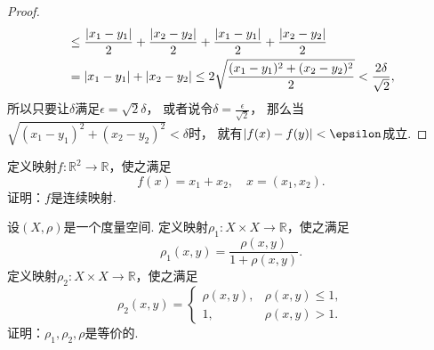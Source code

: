 \begin{example}
\begin{proof}
\begin{align*}
	&\leq \frac{\abs{x_1-y_1}}{2} + \frac{\abs{x_2-y_2}}{2} + \frac{\abs{x_1-y_1}}{2} + \frac{\abs{x_2-y_2}}{2} \\
	&= \abs{x_1-y_1} + \abs{x_2-y_2}
	\leq 2\sqrt{\frac{(x_1-y_1)^2+(x_2-y_2)^2}{2}}
	< \frac{2\delta}{\sqrt2},
\end{align*}
所以只要让\(\delta\)满足\(\epsilon = \sqrt2 \delta\)，
或者说令\(\delta = \frac{\epsilon}{\sqrt2}\)，
那么当\(\sqrt{(x_1-y_1)^2+(x_2-y_2)^2} < \delta\)时，
就有\(\abs{f(x) - f(y)} < \epsilon\)成立.
\end{proof}
\end{example}

\begin{example}
定义映射\(f\colon \mathbb{R}^2 \to \mathbb{R}\)，使之满足\begin{equation*}
	f(x) = x_1 + x_2,
	\quad x=(x_1,x_2).
\end{equation*}
证明：\(f\)是连续映射.
\end{example}

\begin{example}
设\((X,\rho)\)是一个度量空间.
定义映射\(\rho_1\colon X \times X \to \mathbb{R}\)，使之满足\begin{equation*}
	\rho_1(x,y) = \frac{\rho(x,y)}{1+\rho(x,y)}.
\end{equation*}
定义映射\(\rho_2\colon X \times X \to \mathbb{R}\)，使之满足\begin{equation*}
	\rho_2(x,y) = \left\{ \begin{array}{cl}
		\rho(x,y), & \rho(x,y) \leq 1, \\
		1, & \rho(x,y) > 1.
	\end{array} \right.
\end{equation*}
证明：\(\rho_1,\rho_2,\rho\)是等价的.
\end{example}
